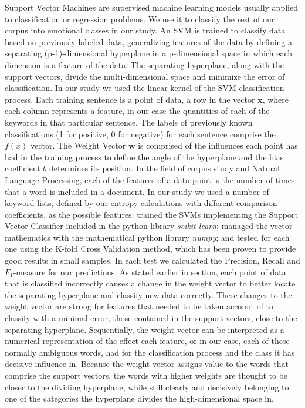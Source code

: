 \documentclass[review]{elsarticle}
\renewcommand{\vec}[1]{\mathbf{#1}}
\begin{document}
Support Vector Machines are supervised machine learning models usually applied to classification or regression problems\cite[][]{cortes1995}. We use it to classify the rest of our corpus into emotional classes in our study. An SVM is trained to classify data based on previously labeled data, generalizing features of the data by defining a separating (p-1)-dimensional hyperplane in a p-dimensional space in which each dimension is a feature of the data. The separating hyperplane, along with the support vectors, divide the multi-dimensional space and minimize the error of classification. In our study we used the linear kernel of the SVM classification process. Each training sentence is a point of data, a row in the vector \(\vec{x}\), where each column represents a feature, in our case the quantities of each of the keywords in that particular sentence. The labels of previously known classifications (1 for positive, 0 for negative) for each sentence comprise the \(f(x)\) vector. The Weight Vector \(\vec{w}\) is comprised of the influences each point has had in the training process to define the angle of the hyperplane and the bias coefficient \(b\) determines its position. In the field of corpus study and Natural Language Processing, each of the features of a data point is the number of times that a word is included in a document. In our study we used a number of keyword lists, defined by our entropy calculations with different comparison coefficients, as the possible features; trained the SVMs implementing the Support Vector Classifier included in the python library \textit{scikit-learn}; managed the vector mathematics with the mathematical python library \textit{numpy}; and tested for each one using the K-fold Cross Validation method, which has been proven to provide good results in small samples\cite[][]{kohavi1995}. In each test we calculated the Precision, Recall and \(F_1\)-measure\cite[][]{powers2011} for our predictions. As stated earlier in section, each point of data that is classified incorrectly causes a change in the weight vector to better locate the separating hyperplane and classify new data correctly. These changes to the weight vector are strong for features that needed to be taken account of to classify with a minimal error, those contained in the support vectors, close to the separating hyperplane. Sequentially, the weight vector can be interpreted as a numerical representation of the effect each feature, or in our case, each of these normally ambiguous words, had for the classification process and the class it has decisive influence in. Because the weight vector assigns value to the words that comprise the support vectors, the words with higher weights are thought to be closer to the dividing hyperplane, while still clearly and decisively belonging to one of the categories the hyperplane divides the high-dimensional space in.
\end{document}
